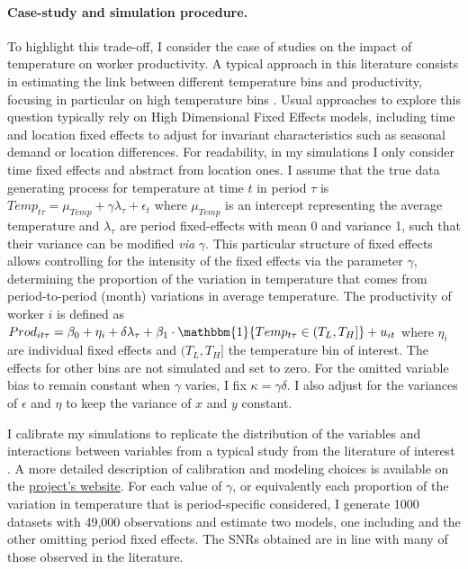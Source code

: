\documentclass[usletter, 12pt]{article}
\begin{document}
			\paragraph{Case-study and simulation procedure.} To highlight this trade-off, I consider the case of studies on the impact of temperature on worker productivity. A typical approach in this literature consists in estimating the link between different temperature bins and productivity, focusing in particular on high temperature bins \citep[for a review of the literature]{lai_effects_2023}. Usual approaches to explore this question typically rely on High Dimensional Fixed Effects models, including time and location fixed effects to adjust for invariant characteristics such as seasonal demand or location differences. For readability, in my simulations I only consider time fixed effects and abstract from location ones. I assume that the true data generating process for temperature at time $t$ in period $\tau$ is $Temp_{t\tau} = \mu_{Temp} +  \gamma\lambda_{\tau} + \epsilon_{t}$ where $\mu_{Temp}$ is an intercept representing the average temperature and $\lambda_{\tau}$ are period fixed-effects with mean 0 and variance 1, such that their variance can be modified \textit{via} $\gamma$. This particular structure of fixed effects allows controlling for the intensity of the fixed effects via the parameter $\gamma$, determining the proportion of the variation in temperature that comes from period-to-period (month) variations in average temperature. The productivity of worker $i$ is defined as $Prod_{it\tau} = \beta_0 + \eta_i + \delta\lambda_{\tau} + \beta_1 \cdot \mathbbm{1}\{Temp_{t\tau} \in (T_L,T_H ] \} + u_{it}$ where $\eta_i$ are individual fixed effects and $(T_L,T_H ]$ the temperature bin of interest. The effects for other bins are  not simulated and set to zero. For the omitted variable bias to remain constant when $\gamma$ varies, I fix $\kappa = \gamma\delta$. I also adjust for the variances of $\epsilon$ and $\eta$ to keep the variance of $x$ and $y$ constant.
			
			I calibrate my simulations to replicate the distribution of the variables and interactions between variables from a typical study from the literature of interest \citep[among others]{stevens_temperature_2017,somanathan_impact_2021,lai_effects_2023,lopalo_temperature_2023}. A more detailed description of calibration and modeling choices is available on the \href{https://vincentbagilet.github.io/causal_exaggeration/FE.html#calibration-and-baseline-parameters-values}{project's website}. For each value of $\gamma$, or equivalently each proportion of the variation in temperature that is period-specific considered, I generate 1000 datasets with 49,000 observations and estimate two models, one including and the other omitting period fixed effects. The SNRs obtained are in line with many of those observed in the literature.
				
\end{document}
